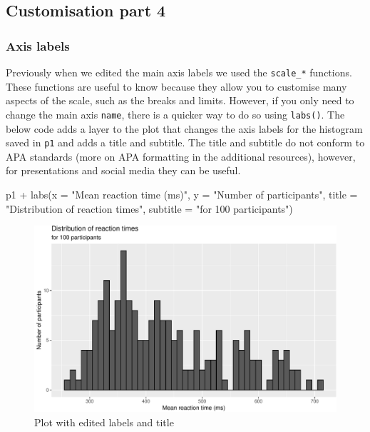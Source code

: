 \documentclass[
  english,
  doc,floatsintext]{apa6}
\newenvironment{Shaded}{\begin{snugshade}}{\end{snugshade}}
\newcommand{\AttributeTok}[1]{\textcolor[rgb]{0.77,0.63,0.00}{#1}}
\newcommand{\FunctionTok}[1]{\textcolor[rgb]{0.00,0.00,0.00}{#1}}
\newcommand{\NormalTok}[1]{#1}
\newcommand{\SpecialCharTok}[1]{\textcolor[rgb]{0.00,0.00,0.00}{#1}}
\newcommand{\StringTok}[1]{\textcolor[rgb]{0.31,0.60,0.02}{#1}}
\begin{document}
\hypertarget{customisation-part-4}{%
\subsection{Customisation part 4}\label{customisation-part-4}}

\hypertarget{axis-labels}{%
\subsubsection{Axis labels}\label{axis-labels}}

Previously when we edited the main axis labels we used the \texttt{scale\_*} functions. These functions are useful to know because they allow you to customise many aspects of the scale, such as the breaks and limits. However, if you only need to change the main axis \texttt{name}, there is a quicker way to do so using \texttt{labs()}. The below code adds a layer to the plot that changes the axis labels for the histogram saved in \texttt{p1} and adds a title and subtitle. The title and subtitle do not conform to APA standards (more on APA formatting in the additional resources), however, for presentations and social media they can be useful.

\begin{Shaded}
\begin{Highlighting}[]
\NormalTok{p1 }\SpecialCharTok{+} \FunctionTok{labs}\NormalTok{(}\AttributeTok{x =} \StringTok{"Mean reaction time (ms)"}\NormalTok{,}
          \AttributeTok{y =} \StringTok{"Number of participants"}\NormalTok{,}
          \AttributeTok{title =} \StringTok{"Distribution of reaction times"}\NormalTok{,}
          \AttributeTok{subtitle =} \StringTok{"for 100 participants"}\NormalTok{)}
\end{Highlighting}
\end{Shaded}

\begin{figure}

{\centering \includegraphics[width=1\linewidth]{images/edited-labels-1} 

}

\caption{Plot with edited labels and title}\label{fig:edited-labels}
\end{figure}
\end{document}
